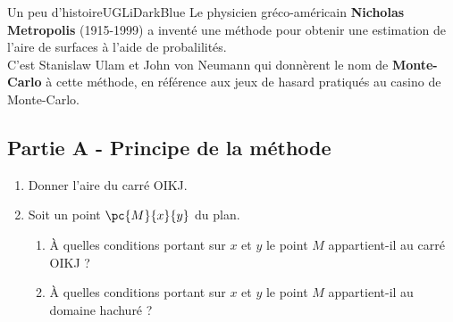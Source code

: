 \documentclass[a4paper,11pt,exos]{nsi} %
\begin{document}
\maketitle

\begin{encadrecolore}{Un peu d'histoire}{UGLiDarkBlue}
    Le physicien gréco-américain \textbf{Nicholas Metropolis} (1915-1999) a inventé une méthode pour obtenir une estimation de l'aire de surfaces à l'aide de probalilités.\\
    C'est Stanislaw Ulam et John von Neumann qui donnèrent le nom de \textbf{Monte-Carlo} à cette méthode, en référence aux jeux de hasard pratiqués au casino de Monte-Carlo.
\end{encadrecolore}

\subsection*{Partie A - Principe de la méthode}
{
    \def\xmin{-0.25}	\def\xmax{1.25}	\def\ymin{-0.25}	\def\ymax{1.25}
    \def\F{\x^(.5)}
}

\begin{enumerate}
    \item Donner l'aire du carré OIKJ.
    \item Soit un point $\pc{M}{x}{y}$ du plan.
    \begin{enumerate}
        \item À quelles conditions portant sur $x$ et $y$ le point $M$ appartient-il au carré OIKJ ?
        \item À quelles conditions portant sur $x$ et $y$ le point $M$ appartient-il au domaine hachuré ? 
    \end{enumerate}
\end{enumerate}
\end{document}
